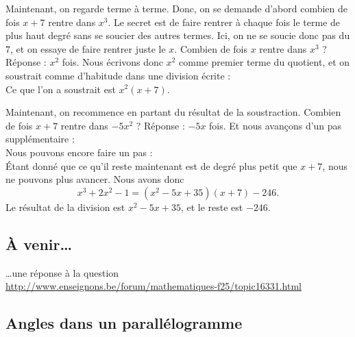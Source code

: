 Maintenant, on regarde terme à terme. Donc, on se demande d'abord combien de fois $x+7$ rentre dans $x^3$. Le secret est de faire rentrer à chaque fois le terme de plus haut degré sans se soucier des autres termes. Ici, on ne se soucie donc pas du $7$, et on essaye de faire rentrer juste le $x$. Combien de fois $x$ rentre dans $x^3$ ? Réponse : $x^2$ fois. Nous écrivons donc $x^2$ comme premier terme du quotient, et on soustrait comme d'habitude dans une division écrite :
\begin{equation}
	
\end{equation}
Ce que l'on a soustrait est $x^2(x+7)$.

Maintenant, on recommence en partant du résultat de la soustraction. Combien de fois $x+7$ rentre dans $-5x^2$ ? Réponse : $-5x$ fois. Et nous avançons d'un pas supplémentaire :
\begin{equation}
	
\end{equation}
Nous pouvons encore faire un pas :
\begin{equation}
	
\end{equation}
Étant donné que ce qu'il reste maintenant est de degré plus petit que $x+7$, nous ne pouvons plus avancer. Nous avons donc
\begin{equation}
	 x^3+2x^2-1 = (x^2-5x+35)(x+7) - 246.
\end{equation}
Le résultat de la division est $x^2-5x+35$, et le reste est $-246$.



					\subsection{À venir\ldots}

\ldots une réponse à la question\\
\url{http://www.enseignons.be/forum/mathematiques-f25/topic16331.html}


\subsection{Angles dans un parallélogramme}

